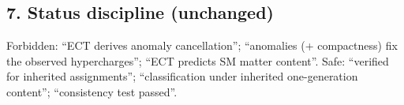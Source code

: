 \subsection*{7. Status discipline (unchanged)}
Forbidden: ``ECT derives anomaly cancellation'';
``anomalies (+ compactness) fix the observed hypercharges'';
``ECT predicts SM matter content''.
Safe: ``verified for inherited assignments'';
``classification under inherited one-generation content'';
``consistency test passed''.
